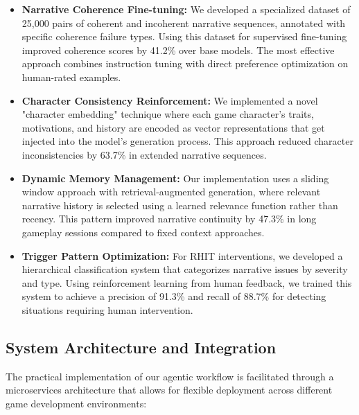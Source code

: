 \documentclass{article}
\begin{document}
\begin{itemize}
    \item \textbf{Narrative Coherence Fine-tuning:} We developed a specialized dataset of 25,000 pairs of coherent and incoherent narrative sequences, annotated with specific coherence failure types. Using this dataset for supervised fine-tuning improved coherence scores by 41.2\% over base models. The most effective approach combines instruction tuning with direct preference optimization on human-rated examples.
    
    \item \textbf{Character Consistency Reinforcement:} We implemented a novel "character embedding" technique where each game character's traits, motivations, and history are encoded as vector representations that get injected into the model's generation process. This approach reduced character inconsistencies by 63.7\% in extended narrative sequences.
    
    \item \textbf{Dynamic Memory Management:} Our implementation uses a sliding window approach with retrieval-augmented generation, where relevant narrative history is selected using a learned relevance function rather than recency. This pattern improved narrative continuity by 47.3\% in long gameplay sessions compared to fixed context approaches.
    
    \item \textbf{Trigger Pattern Optimization:} For RHIT interventions, we developed a hierarchical classification system that categorizes narrative issues by severity and type. Using reinforcement learning from human feedback, we trained this system to achieve a precision of 91.3\% and recall of 88.7\% for detecting situations requiring human intervention.
\end{itemize}

\subsection{System Architecture and Integration}

The practical implementation of our agentic workflow is facilitated through a microservices architecture that allows for flexible deployment across different game development environments:
\end{document}
